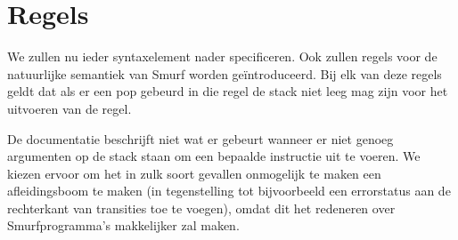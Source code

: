 \section{Regels} %
\label{sec:rules}

We zullen nu ieder syntaxelement nader specificeren. Ook zullen regels voor de
natuurlijke semantiek van Smurf worden geïntroduceerd. Bij elk van deze regels geldt dat als er een pop gebeurd in die regel de stack niet leeg mag zijn voor het uitvoeren van de regel.

De documentatie \cite{safalra} beschrijft niet wat er gebeurt wanneer er niet
genoeg argumenten op de stack staan om een bepaalde instructie uit te voeren.
We kiezen ervoor om het in zulk soort gevallen onmogelijk te maken een
afleidingsboom te maken (in tegenstelling tot bijvoorbeeld een errorstatus aan
de rechterkant van transities toe te voegen), omdat dit het redeneren over
Smurfprogramma's makkelijker zal maken.













